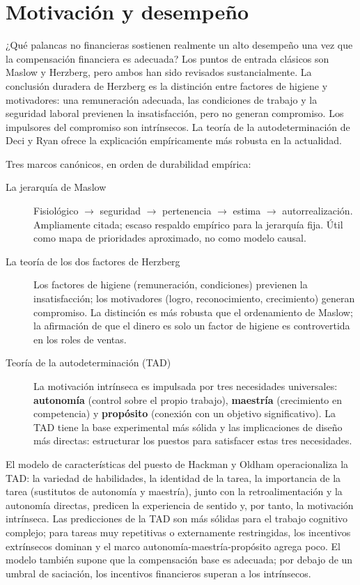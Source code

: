 \section{Motivación y desempeño}\label{sec:motivation}

¿Qué palancas no financieras sostienen realmente un alto desempeño una vez que la compensación financiera es adecuada? Los puntos de entrada clásicos son Maslow y Herzberg, pero ambos han sido revisados sustancialmente. La conclusión duradera de Herzberg es la distinción entre factores de higiene y motivadores: una remuneración adecuada, las condiciones de trabajo y la seguridad laboral previenen la insatisfacción, pero no generan compromiso. Los impulsores del compromiso son intrínsecos. La teoría de la autodeterminación de Deci y Ryan ofrece la explicación empíricamente más robusta en la actualidad.

Tres marcos canónicos, en orden de durabilidad empírica:
\begin{description}
  \item[La jerarquía de Maslow] Fisiológico $\to$ seguridad $\to$ pertenencia $\to$ estima $\to$ autorrealización. Ampliamente citada; escaso respaldo empírico para la jerarquía fija. Útil como mapa de prioridades aproximado, no como modelo causal.
  \item[La teoría de los dos factores de Herzberg] Los factores de higiene (remuneración, condiciones) previenen la insatisfacción; los motivadores (logro, reconocimiento, crecimiento) generan compromiso. La distinción es más robusta que el ordenamiento de Maslow; la afirmación de que el dinero es solo un factor de higiene es controvertida en los roles de ventas.
  \item[Teoría de la autodeterminación (TAD)] La motivación intrínseca es impulsada por tres necesidades universales: \textbf{autonomía} (control sobre el propio trabajo), \textbf{maestría} (crecimiento en competencia) y \textbf{propósito} (conexión con un objetivo significativo). La TAD tiene la base experimental más sólida y las implicaciones de diseño más directas: estructurar los puestos para satisfacer estas tres necesidades.
\end{description}
El modelo de características del puesto de Hackman y Oldham operacionaliza la TAD: la variedad de habilidades, la identidad de la tarea, la importancia de la tarea (sustitutos de autonomía y maestría), junto con la retroalimentación y la autonomía directas, predicen la experiencia de sentido y, por tanto, la motivación intrínseca. Las predicciones de la TAD son más sólidas para el trabajo cognitivo complejo; para tareas muy repetitivas o externamente restringidas, los incentivos extrínsecos dominan y el marco autonomía-maestría-propósito agrega poco. El modelo también supone que la compensación base es adecuada; por debajo de un umbral de saciación, los incentivos financieros superan a los intrínsecos.

